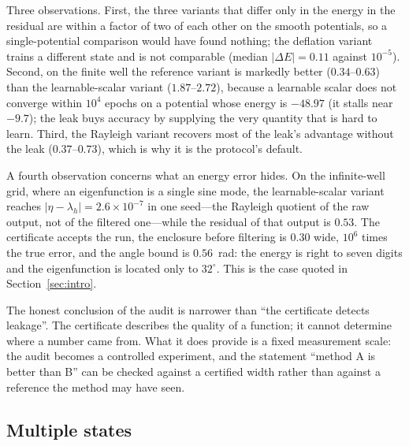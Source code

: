 \begin{table}[t]
\centering
\small

\caption{Leakage audit: same architecture, $10^4$ epochs, only the energy in
the residual changes. Median $|\Delta E|$ is measured against the discrete
reference; widths are after filtering.}
\label{tab:leakage}
\end{table}

Three observations. First, the three variants that differ only in the energy
in the residual are within a factor of two of each other on the smooth
potentials, so a single-potential comparison would have found nothing; the
deflation variant trains a different state and is not comparable (median
$|\Delta E|=0.11$ against $10^{-5}$). Second, on the finite well the reference variant is markedly better
($0.34$--$0.63$) than the learnable-scalar variant ($1.87$--$2.72$), because a
learnable scalar does not converge within $10^4$ epochs on a potential whose
energy is $-48.97$ (it stalls near $-9.7$); the leak buys accuracy by
supplying the very quantity that is hard to learn. Third, the Rayleigh variant
recovers most of the leak's advantage without the leak ($0.37$--$0.73$),
which is why it is the protocol's default.

A fourth observation concerns what an energy error hides. On the
infinite-well grid, where an eigenfunction is a single sine mode, the
learnable-scalar variant reaches $|\eta-\lambda_h|=2.6\times10^{-7}$ in one
seed---the Rayleigh quotient of the raw output, not of the filtered one---while
the residual of that output is $0.53$. The certificate accepts the run, the
enclosure before filtering is $0.30$ wide, $10^{6}$ times the true error, and
the angle bound is $0.56$~rad: the energy is right to seven digits and the
eigenfunction is located only to $32^\circ$. This is the case quoted in
Section~\ref{sec:intro}.

The honest conclusion of the audit is narrower than ``the certificate detects
leakage''. The certificate describes the quality of a function; it cannot
determine where a number came from. What it does provide is a fixed
measurement scale: the audit becomes a controlled experiment, and the
statement ``method A is better than B'' can be checked against a certified
width rather than against a reference the method may have seen.

\subsection{Multiple states}
\label{sec:multistate}

